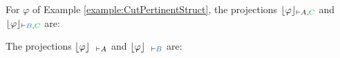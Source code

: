 \documentclass{llncs}
\begin{document}
\begin{example}
\label{example:OProjections}
For $\varphi$ of Example \ref{example:CutPertinentStruct}, the projections $\projectionO{\varphi}{\seq \hA{A}, \hE{C}}$ and $\projectionO{\varphi}{\seq \hB{B}, \hE{C}}$ are:
\begin{small}
\begin{multicols}{2}{
\begin{prooftree}
	 
	 
							 
\end{prooftree}

\begin{prooftree}
	 
	 
							 
\end{prooftree}
}
\end{multicols}
\end{small}

\noindent
The projections $\projectionO{\varphi}{\hF{C} \seq \hA{A}}$ and $\projectionO{\varphi}{\hF{C} \seq \hB{B}}$ are:
\begin{small}
\begin{multicols}{2}{
\begin{prooftree}
 
 
								 
								 
\end{prooftree}

\begin{prooftree}
 
 
								 
								 
\end{prooftree}
}
\end{multicols}
\end{small}


\end{example}
\end{document}
